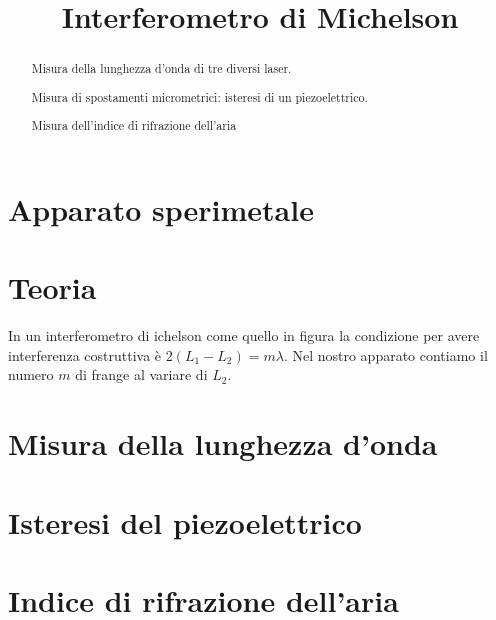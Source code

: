 \documentclass[a4paper]{article}
\begin{document}
	\title{Interferometro di Michelson}
	\maketitle
	
	\begin{abstract}
		 Misura della lunghezza d'onda di tre diversi laser.
		 
		 Misura di spostamenti micrometrici: isteresi di un piezoelettrico.
		 
		 Misura dell'indice di rifrazione dell'aria
	\end{abstract}

\section{Apparato sperimetale}

\section{Teoria}
	In un interferometro di ichelson come quello in figura la condizione per avere interferenza costruttiva è $2(L_1 -L_2) = m \lambda$. Nel nostro apparato contiamo il numero $m$ di frange al variare di $L_2$. 

\section{Misura della lunghezza d'onda}

\section{Isteresi del piezoelettrico}

\section{Indice di rifrazione dell'aria}
\end{document}
